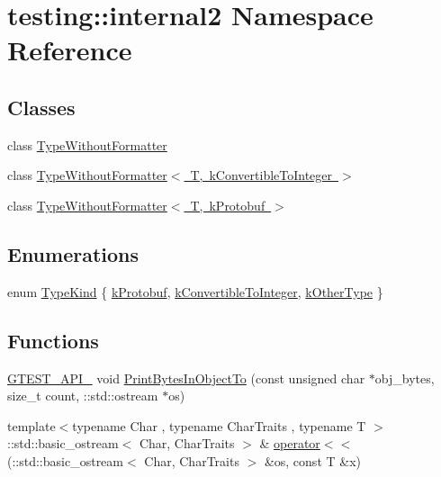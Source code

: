 \hypertarget{namespacetesting_1_1internal2}{}\section{testing\+::internal2 Namespace Reference}
\label{namespacetesting_1_1internal2}
\subsection*{Classes}
\begin{DoxyCompactItemize}
\item 
class \mbox{\hyperlink{classtesting_1_1internal2_1_1_type_without_formatter}{Type\+Without\+Formatter}}
\item 
class \mbox{\hyperlink{classtesting_1_1internal2_1_1_type_without_formatter_3_01_t_00_01k_convertible_to_integer_01_4}{Type\+Without\+Formatter$<$ T, k\+Convertible\+To\+Integer $>$}}
\item 
class \mbox{\hyperlink{classtesting_1_1internal2_1_1_type_without_formatter_3_01_t_00_01k_protobuf_01_4}{Type\+Without\+Formatter$<$ T, k\+Protobuf $>$}}
\end{DoxyCompactItemize}
\subsection*{Enumerations}
\begin{DoxyCompactItemize}
\item 
enum \mbox{\hyperlink{namespacetesting_1_1internal2_aeb8161b0b3ee503347b0662d7028fd57}{Type\+Kind}} \{ \mbox{\hyperlink{namespacetesting_1_1internal2_aeb8161b0b3ee503347b0662d7028fd57a14aaf98a2547ecf43eef0868d54b1383}{k\+Protobuf}}, 
\mbox{\hyperlink{namespacetesting_1_1internal2_aeb8161b0b3ee503347b0662d7028fd57a9bdcf3f1548f498b2b7f097306ea0224}{k\+Convertible\+To\+Integer}}, 
\mbox{\hyperlink{namespacetesting_1_1internal2_aeb8161b0b3ee503347b0662d7028fd57abe8aaea44751d6ebd0cdf5bd94451db1}{k\+Other\+Type}}
 \}
\end{DoxyCompactItemize}
\subsection*{Functions}
\begin{DoxyCompactItemize}
\item 
\mbox{\hyperlink{gtest-port_8h_aa73be6f0ba4a7456180a94904ce17790}{G\+T\+E\+S\+T\+\_\+\+A\+P\+I\+\_\+}} void \mbox{\hyperlink{namespacetesting_1_1internal2_a9fbf8e07c0f94dc74d6ef5e56cd3c553}{Print\+Bytes\+In\+Object\+To}} (const unsigned char $\ast$obj\+\_\+bytes, size\+\_\+t count, \+::std\+::ostream $\ast$os)
\item 
{\footnotesize template$<$typename Char , typename Char\+Traits , typename T $>$ }\\\+::std\+::basic\+\_\+ostream$<$ Char, Char\+Traits $>$ \& \mbox{\hyperlink{namespacetesting_1_1internal2_a07dbe129beb8952074f04b599dfce39b}{operator$<$$<$}} (\+::std\+::basic\+\_\+ostream$<$ Char, Char\+Traits $>$ \&os, const T \&x)
\end{DoxyCompactItemize}
